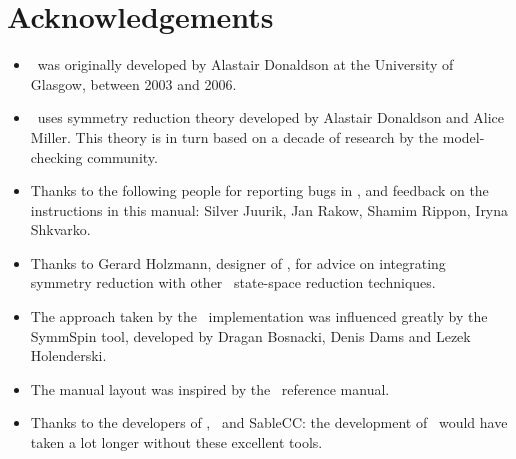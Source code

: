\chapter*{Acknowledgements}

\begin{itemize}

\item \topspin\ was originally developed by Alastair Donaldson at the University of Glasgow, between 2003 and 2006.

\item \topspin\ uses symmetry reduction theory developed by Alastair Donaldson and Alice Miller.  This theory is
in turn based on a decade of research by the model-checking
community.

\item Thanks to the following people for reporting bugs in \topspin, and feedback on the instructions in this
manual: Silver Juurik, Jan Rakow, Shamim Rippon, Iryna Shkvarko.

\item Thanks to Gerard Holzmann, designer of \spin, for advice on integrating symmetry reduction with other \spin\ state-space reduction techniques.

\item The approach taken by the \topspin\ implementation was influenced greatly by the SymmSpin tool, developed
by Dragan Bosnacki, Denis Dams and Lezek Holenderski.

\item The manual layout was inspired by the \gap\ reference manual.

\item Thanks to the developers of \gap, \saucy\ and SableCC: the development of \topspin\ would have taken a lot
longer without these excellent tools.

\end{itemize}

